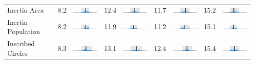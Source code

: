 \begin{table}
\begin{tabular}{l rm{7em} rm{7em} rm{7em} rm{7em}}
Inertia Area           &   8.2 &    \includegraphics[width=7em]{mini_hist/TX_2004_inertia_a} &  12.4 &    \includegraphics[width=7em]{mini_hist/TX_2008_inertia_a} &  11.7 &    \includegraphics[width=7em]{mini_hist/TX_2012_inertia_a} &  15.2 &    \includegraphics[width=7em]{mini_hist/TX_2016_inertia_a} \\
Inertia Population     &   8.2 &    \includegraphics[width=7em]{mini_hist/TX_2004_inertia_p} &  11.9 &    \includegraphics[width=7em]{mini_hist/TX_2008_inertia_p} &  11.2 &    \includegraphics[width=7em]{mini_hist/TX_2012_inertia_p} &  15.1 &    \includegraphics[width=7em]{mini_hist/TX_2016_inertia_p} \\
Inscribed Circles      &   8.3 &    \includegraphics[width=7em]{mini_hist/TX_2004_ehrenburg} &  13.1 &    \includegraphics[width=7em]{mini_hist/TX_2008_ehrenburg} &  12.4 &    \includegraphics[width=7em]{mini_hist/TX_2012_ehrenburg} &  15.4 &    \includegraphics[width=7em]{mini_hist/TX_2016_ehrenburg} \\

\end{tabular}
\end{table}

